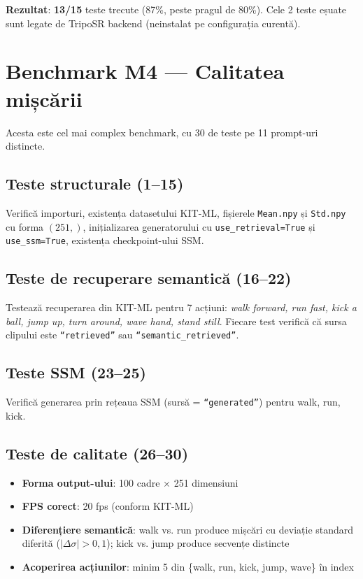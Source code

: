 \textbf{Rezultat}: \textbf{13/15} teste trecute (87\%, peste pragul de 80\%).  Cele 2 teste eșuate sunt legate de TripoSR backend (neinstalat pe configurația curentă).

\section{Benchmark M4 --- Calitatea mișcării}
\label{sec:bench_m4}

Acesta este cel mai complex benchmark, cu 30 de teste pe 11 prompt-uri distincte.

\subsection{Teste structurale (1--15)}

Verifică importuri, existența datasetului KIT-ML, fișierele \texttt{Mean.npy} și \texttt{Std.npy} cu forma $(251,)$, inițializarea generatorului cu \texttt{use\_retrieval=True} și \texttt{use\_ssm=True}, existența checkpoint-ului SSM.

\subsection{Teste de recuperare semantică (16--22)}

Testează recuperarea din KIT-ML pentru 7 acțiuni: \textit{walk forward, run fast, kick a ball, jump up, turn around, wave hand, stand still}.  Fiecare test verifică că sursa clipului este \texttt{``retrieved''} sau \texttt{``semantic\_retrieved''}.

\subsection{Teste SSM (23--25)}

Verifică generarea prin rețeaua SSM (sursă = \texttt{``generated''}) pentru walk, run, kick.

\subsection{Teste de calitate (26--30)}

\begin{itemize}
    \item \textbf{Forma output-ului}: 100 cadre $\times$ 251 dimensiuni
    \item \textbf{FPS corect}: 20 fps (conform KIT-ML)
    \item \textbf{Diferențiere semantică}: walk vs. run produce mișcări cu deviație standard diferită ($|\Delta\sigma| > 0{,}1$); kick vs. jump produce secvențe distincte
    \item \textbf{Acoperirea acțiunilor}: minim 5 din \{walk, run, kick, jump, wave\} în index
\end{itemize}

